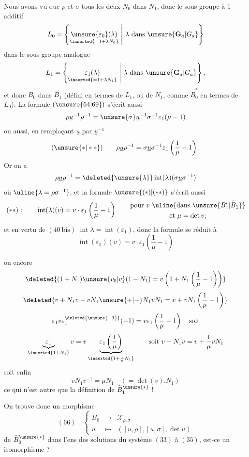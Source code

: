 Nous avons vu que $\rho$ et $\sigma$ tous les deux  $N_0$ dans $N_1$, donc le sous-groupe à $1$  additif
\[
L_0=\left\{\underset{\inserted{=1+\lambda N_0}}{\unsure{\varepsilon_0}(\lambda)}\ \middle|\ \lambda\text{ dans }\unsure{\mathbf G_a|G_a}\right\}
\]
dans le sous-groupe analogue
\[
L_1=\left\{\underset{\inserted{=1+\lambda N_1}}{\varepsilon_1(\lambda)}\ \middle|\ \lambda\text{ dans }\unsure{\mathbf G_a|G_a}\right\},
\]
et donc $\widetilde B_0$ dans $\widetilde B_1$ (défini en termes de $L_1$, ou de $N_1$, comme $\widetilde B_0^*$ en termes de $L_0$).  La formule $(\unsure{64|69})$ s'écrit aussi
\[
\rho\underline u^{-1}\rho^{-1}=\unsure{\sigma}\underline u^{-1}\sigma^{-1}\varepsilon_1(\mu-1)
\]
ou aussi, en remplaçant $\underline u$ par $\underline u^{-1}$
\[
(\unsure{*|**})\qquad
\rho\underline u\rho^{-1}=\sigma\underline u\sigma^{-1}\varepsilon_1\left(\frac1\mu-1\right).
\]
Or on  a
\[
\rho\underline u\rho^{-1}=\deleted{\unsure{\lambda}}\operatorname{int}(\lambda)(\sigma\underline u\sigma^{-1})
\]
où $\uline{\lambda=\rho\sigma^{-1}}$, et la formule $\unsure{(*)|(**)}$ s'écrit aussi
\[
(**):\qquad
\operatorname{int}(\lambda)(v)=v\cdot\varepsilon_1\left(\frac1\mu-1\right)
\qquad\begin{gathered}
\text{pour }v\ \uline{\text{dans }\unsure{B'_1|\widetilde B_1}}\\
\text{et }\mu=\det v;
\end{gathered}
\]
et en vertu de $(40\ \mathrm{bis})$ $\operatorname{int}\lambda=\operatorname{int}(\varepsilon_1)$, donc la formule se réduit à
\[
\operatorname{int}(\varepsilon_1)(v)=v\cdot\varepsilon_1\left(\frac1\mu-1\right)
\]



ou encore
\[
\deleted{(1+N_1)\unsure{v_0|v}(1-N_1)=v\left(1+N_1\left(\frac1\mu-1\right)\right)}
\]
\[
\deleted{v+N_1v-vN_1\unsure{+|-}N_1vN_1=v+vN_1\left(\frac1\mu-1\right)}
\]
\[
\varepsilon_1v\varepsilon_1^{\deleted{\unsure{-1}}}(-1)=v\varepsilon_1\left(\frac1\mu-1\right)\quad\text{soit}
\]
\[
\underbrace{\varepsilon_1}_{\inserted{1+N_1}}v
=v\underbrace{\varepsilon_1\left(\frac1\mu\right)}_{\inserted{1+\frac1\mu N_1}}
\qquad\text{soit }v+N_1v=v+\frac1\mu vN_1
\]
soit enfin
\[
vN_1v^{-1}=\mu N_1\quad(=\det(v).N_1)
\]
ce qui n'est autre que la définition de $\widetilde B_1^{\unsure{*}}$ !

On trouve donc un morphisme
\[
(66)\quad\left\{\begin{array}{rcl}
\widetilde B_0&\longrightarrow&\mathcal X_{\rho,\sigma}\\
\underline u&\longmapsto&([\underline u,\rho],[\underline u,\sigma],\det\underline u)
\end{array}\right.
\]
de $\widetilde B_0^{\unsure{*}}$ dans l'ens des solutions du système $(33)$ à $(35)$, est-ce un isomorphisme ?

